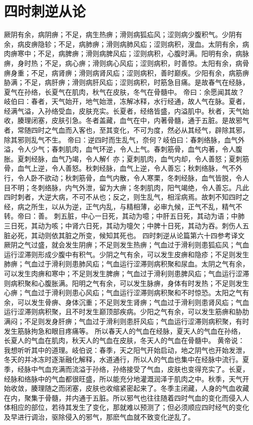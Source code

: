 \documentclass[a4paper,12pt,UTF8,twoside]{ctexbook}
\begin{document}
\chapter{四时刺逆从论}
厥阴有余，病阴痹；不足，病生热痹；滑则病狐疝风；涩则病少腹积气。少阴有余，病皮痹隐轸；不足，病肺痹；滑则病肺风疝；涩则病积，溲血。太阴有余，病肉痹寒中；不足，病脾痹；滑则病脾风疝；涩则病积，心腹时满。阳明有余，病脉痹，身时热；不足，病心痹；滑则病心风疝；涩则病积，时善惊。太阳有余，病骨痹身重；不足，病肾痹；滑则病肾风疝；涩则病积，善时巅疾。少阳有余，病筋痹胁满；不足，病肝痹；滑则病肝风疝；涩则病积，时筋急目痛。是故春气在经脉，夏气在孙络，长夏气在肌肉，秋气在皮肤，冬气在骨髓中。
帝曰：余愿闻其故？岐伯曰：春者，天气始开，地气始泄，冻解冰释，水行经通，故人气在脉。夏者，经满气溢，入孙络受血，皮肤充实。长夏者，经络皆盛，内溢肌中。秋者，天气始收，腠理闭塞，皮肤引急。冬者盖藏，血气在中，内著骨髓，通于五脏。是故邪气者，常随四时之气血而入客也，至其变化，不可为度，然必从其经气，辟除其邪，除其邪则乱气不生。
帝曰：逆四时而生乱气，奈何？岐伯曰：春刺络脉，血气外溢，令人少气；春刺肌肉，血气环逆，令人上气。春刺筋骨，血气内著，令人腹胀。夏刺经脉，血气乃竭，令人解亻亦；夏刺肌肉，血气内却，令人善怒；夏刺筋骨，血气上逆，令人善怒。秋刺经脉，血气上逆，令人善忘；秋刺络脉，气不外行，令人卧不欲动；秋刺筋骨，血气内散，令人寒栗，冬刺经脉，血气皆脱，令人目不明；冬刺络脉，内气外泄，留为大痹；冬刺肌肉，阳气竭绝，令人善忘。凡此四时刺者，大逆大病，不可不从也；反之，则生乱气，相淫病焉。故刺不知四时之经，病之所生，以从为逆，正气内乱，与精相薄，必审九候，正气不乱，精气不转。帝曰：善。
刺五脏，中心一日死，其动为噫；中肝五日死，其动为语；中肺三日死，其动为咳；中肾六日死，其动为嚏欠；中脾十日死，其动为吞。刺伤人五脏必死，其动则依其脏之所变，候知其死也。
四时刺逆从论篇第六十四参考译文
厥阴之气过盛，就会发生阴痹；不足则发生热痹；气血过于滑利则患狐疝风；气血运行涩滞则形成少腹中有积气。少阴之气有余，可以发生皮痹和隐疹；不足则发生肺痹；气血过于滑利则患肺风疝；气血运行涩滞则病积聚和尿血。太阴之气有余，可以发生肉痹和寒中；不足则发生脾痹；气血过于滑利则患脾风疝；气血运行涩滞则病积聚和心腹胀满。阳明之气有余，可以发生脉痹，身体有时发热；不足则发生心痹；气血过于滑利则患心风疝；气血运行涩滞则病积聚和不时惊恐。太阳之气有余，可以发生骨痹、身体沉重；不足则发生肾痹；气血过于滑利则患肾风疝；气血运行涩滞则病积聚，且不时发生巅顶部疾病。少阳之气有余，可以发生筋痹和胁肋满闷；不足则发身肝痹；气血过于滑利则患肝风疝；气血运行涩滞则病积聚，有时发生筋脉拘急和眼目疼痛等。
所以春天人的气血在经脉，夏天人的气血在孙络，长夏人的气血在肌肉，秋天人的气血在皮肤，冬天人的气血在骨髓中。
黄帝说：我想听听其中的道理。岐伯说：春季，天之阳气开始启动，地之阴气也开始发泄，冬天的并冰冻时逐渐融化解释，水道通行，所以人的气血也集中在经脉中流行。夏季，经脉中气血充满而流溢于孙络，孙络接受了气血，皮肤也变得充实了。长夏，经脉和络脉中的气血都很旺盛，所以能充分地灌溉润泽于肌肉之中。秋季，天气开始收敛，腠理随之而闭塞，皮肤也收缩紧密起来了。冬季主闭藏，人身的气血收藏在内，聚集于骨髓，并内通于五脏。所以邪气也往往随着四时气血的变化而侵入人体相应的部位，若待其发生了变化，那就难以预测了；但必须顺应四时经气的变化及早进行调治，驱除侵入的邪气，那麽气血就不致变化逆乱了。
\end{document}
